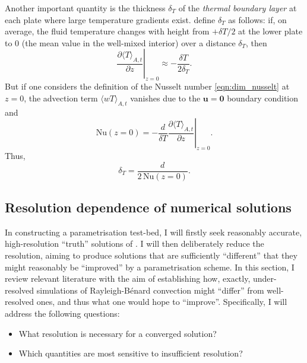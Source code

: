 \documentclass[titlepage,twoside]{article}
\numberwithin{equation}{section}
\newcommand{\pdiff}[2]{\frac{\partial #1}{\partial #2}}
\renewcommand\vec{\bm}
\newcommand{\nusselt}{\ensuremath{\mathrm{Nu}}}
\newcommand{\rb}{Rayleigh-B\'{e}nard}
\begin{document}
Another important quantity is the thickness $\delta_T$ of the \emph{thermal
boundary layer} at each plate where large temperature gradients exist.
\textcite{chilla2012} define $\delta_T$ as follows: if, on average, the fluid
temperature changes with height from $+\delta T/2$ at the lower plate to $0$
(the mean value in the well-mixed interior) over a distance $\delta_T$, then
\[
    \left. \pdiff{\langle T \rangle_{A,t}}{z} \right|_{z=0}
        \approx -\frac{\delta T}{2 \delta_T}.
\]
But if one considers the definition of the Nusselt number
\cref{eqn:dim_nusselt} at $z=0$, the advection term $\langle wT \rangle_{A,t}$
vanishes due to the $\vec{u} = \vec{0}$ boundary condition and
\[
    \nusselt(z=0) = -\frac{d}{\delta T}
        \left. \pdiff{\langle T \rangle_{A,t}}{z} \right|_{z=0}.
\]
Thus,
\begin{equation}
    \label{eqn:thermal_bl}
    \delta_T = \frac{d}{2\,\nusselt(z=0)}.
\end{equation}


\subsection{Resolution dependence of numerical solutions}
In constructing a parametrisation test-bed, I will firstly seek
reasonably accurate, high-resolution ``truth'' solutions of
. I will then deliberately reduce
the resolution, aiming to produce solutions that are sufficiently
``different'' that they might reasonably be ``improved'' by a parametrisation
scheme. In this section, I review relevant literature with the aim of
establishing how, exactly, under-resolved simulations of \rb{} convection
might ``differ'' from well-resolved ones, and thus what one would hope to
``improve''. Specifically, I will address the following questions:
\begin{itemize}
    \item What resolution is necessary for a converged solution?
    \item Which quantities are most sensitive to insufficient resolution?
\end{itemize}
\end{document}
